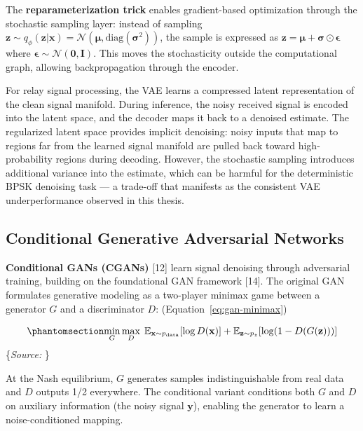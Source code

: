 \documentclass[
  english,
  12pt,
  12pt,
  a4paper,
  oneside]{report}
\begin{document}
The \textbf{reparameterization trick} enables gradient-based optimization through the stochastic sampling layer: instead of sampling \(\mathbf{z} \sim q_\phi(\mathbf{z} | \mathbf{x}) = \mathcal{N}(\boldsymbol{\mu}, \text{diag}(\boldsymbol{\sigma}^2))\), the sample is expressed as \(\mathbf{z} = \boldsymbol{\mu} + \boldsymbol{\sigma} \odot \boldsymbol{\epsilon}\) where \(\boldsymbol{\epsilon} \sim \mathcal{N}(\mathbf{0}, \mathbf{I})\). This moves the stochasticity outside the computational graph, allowing backpropagation through the encoder.

For relay signal processing, the VAE learns a compressed latent representation of the clean signal manifold. During inference, the noisy received signal is encoded into the latent space, and the decoder maps it back to a denoised estimate. The regularized latent space provides implicit denoising: noisy inputs that map to regions far from the learned signal manifold are pulled back toward high-probability regions during decoding. However, the stochastic sampling introduces additional variance into the estimate, which can be harmful for the deterministic BPSK denoising task --- a trade-off that manifests as the consistent VAE underperformance observed in this thesis.

\subsection{Conditional Generative Adversarial Networks}\label{sec:conditional-generative-adversarial-networks}

\textbf{Conditional GANs (CGANs)} {[}12{]} learn signal denoising through adversarial training, building on the foundational GAN framework {[}14{]}. The original GAN formulates generative modeling as a two-player minimax game between a generator \(G\) and a discriminator \(D\): (Equation~\ref{eq:gan-minimax})

\begin{equation}\protect\phantomsection\label{eq:gan-minimax}{\min_G \max_D \; \mathbb{E}_{\mathbf{x} \sim p_{\text{data}}}[\log D(\mathbf{x})] + \mathbb{E}_{\mathbf{z} \sim p_z}[\log(1 - D(G(\mathbf{z})))]
}\end{equation} \footnotesize\{\textit{Source: \1}\}\normalsize

At the Nash equilibrium, \(G\) generates samples indistinguishable from real data and \(D\) outputs 1/2 everywhere. The conditional variant conditions both \(G\) and \(D\) on auxiliary information (the noisy signal \(\mathbf{y}\)), enabling the generator to learn a noise-conditioned mapping.
\end{document}
